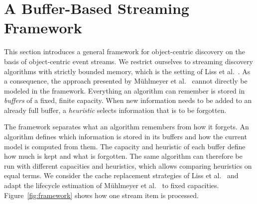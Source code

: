 \providecommand{\mi}[1]{\mathit{#1}}
\providecommand{\la}{\langle}
\providecommand{\ra}{\rangle}
\providecommand{\Utime}{\mathcal{U}_{\mi{time}}}
\providecommand{\Uact}{\mathcal{U}_{\mi{act}}}
\providecommand{\Uobj}{\mathcal{U}_{\mi{obj}}}
\providecommand{\Utype}{\mathcal{U}_{\mi{type}}}
\providecommand{\Uattr}{\mathcal{U}_{\mi{attr}}}
\providecommand{\Uval}{\mathcal{U}_{\mi{val}}}
\providecommand{\Uqual}{\mathcal{U}_{\mi{qual}}}
\providecommand{\Uev}{\mathcal{U}_{\mi{ev}}}
\providecommand{\Uoo}{\mathcal{U}_{\mi{o2o}}}
\providecommand{\Uau}{\mathcal{U}_{\mi{au}}}
\providecommand{\Uitem}{\mathcal{U}_{\mi{item}}}
\providecommand{\Umod}{\mathcal{U}_{\mi{model}}}
\providecommand{\pfun}{\nrightarrow}
\providecommand{\restr}{\mathord{\upharpoonright}}
\providecommand{\ocs}[2]{\ensuremath{\left\{\begin{smallmatrix} #1 \\ #2
  \end{smallmatrix}\right\}}}

\section{A Buffer-Based Streaming Framework}
\label{sec:framework}

This section introduces a general framework for object-centric discovery on the basis of object-centric event streams. We restrict ourselves to streaming discovery algorithms with strictly bounded memory, which is the setting of Liss et al.~\cite{Liss2025}. As a consequence, the approach presented by Mühlmeyer et al.~\cite{Muehlmeyer2026} cannot directly be modeled in the framework. Everything an algorithm can remember is stored in \emph{buffers} of a fixed, finite capacity. When new information needs to be added to an already full buffer, a \emph{heuristic} selects information that is to be forgotten.

The framework separates what an algorithm remembers from how it forgets. An algorithm defines which information is stored in its buffers and how the current model is computed from them. The capacity and heuristic of each buffer define how much is kept and what is forgotten. The same algorithm can therefore be run with different capacities and heuristics, which allows comparing heuristics on equal terms. We consider the cache replacement strategies of Liss et al.~\cite{Liss2025} and adapt the lifecycle estimation of Mühlmeyer et al.~\cite{Muehlmeyer2026} to fixed capacities. Figure~\ref{fig:framework} shows how one stream item is processed.


